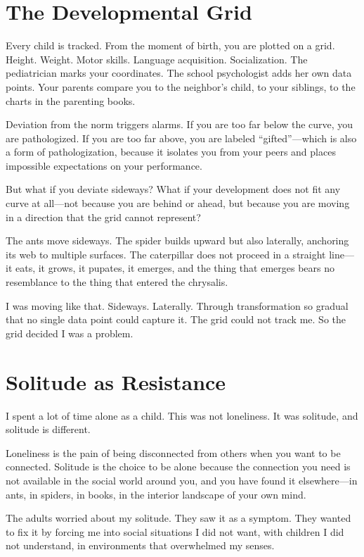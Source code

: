 \documentclass[11pt,openany]{book}
\begin{document}
\section*{The Developmental Grid}

Every child is tracked. From the moment of birth, you are plotted on a grid. Height. Weight. Motor skills. Language acquisition. Socialization. The pediatrician marks your coordinates. The school psychologist adds her own data points. Your parents compare you to the neighbor's child, to your siblings, to the charts in the parenting books.

Deviation from the norm triggers alarms. If you are too far below the curve, you are pathologized. If you are too far above, you are labeled ``gifted''---which is also a form of pathologization, because it isolates you from your peers and places impossible expectations on your performance.

But what if you deviate sideways? What if your development does not fit any curve at all---not because you are behind or ahead, but because you are moving in a direction that the grid cannot represent?

The ants move sideways. The spider builds upward but also laterally, anchoring its web to multiple surfaces. The caterpillar does not proceed in a straight line---it eats, it grows, it pupates, it emerges, and the thing that emerges bears no resemblance to the thing that entered the chrysalis.

I was moving like that. Sideways. Laterally. Through transformation so gradual that no single data point could capture it. The grid could not track me. So the grid decided I was a problem.

\section*{Solitude as Resistance}

I spent a lot of time alone as a child. This was not loneliness. It was solitude, and solitude is different.

Loneliness is the pain of being disconnected from others when you want to be connected. Solitude is the choice to be alone because the connection you need is not available in the social world around you, and you have found it elsewhere---in ants, in spiders, in books, in the interior landscape of your own mind.

The adults worried about my solitude. They saw it as a symptom. They wanted to fix it by forcing me into social situations I did not want, with children I did not understand, in environments that overwhelmed my senses.
\end{document}
